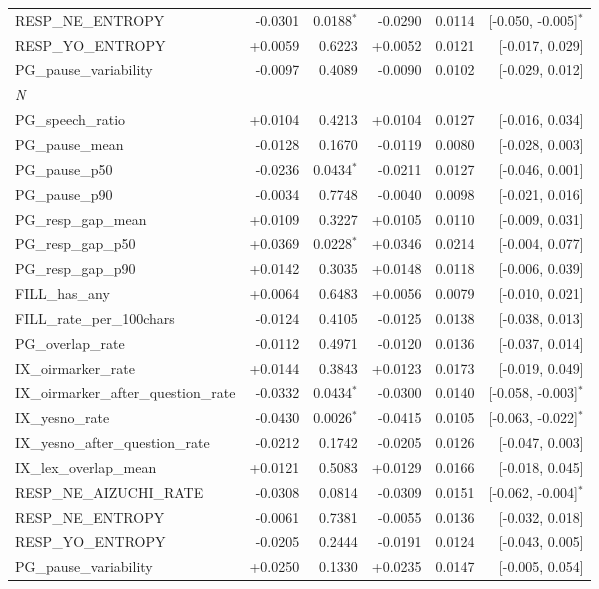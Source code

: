 \begin{longtable}{lrrrrr}
\quad RESP\_NE\_ENTROPY & -0.0301 & 0.0188$^{*}$ & -0.0290 & 0.0114 & [-0.050, -0.005]$^{*}$ \\
\quad RESP\_YO\_ENTROPY & +0.0059 & 0.6223 & +0.0052 & 0.0121 & [-0.017, 0.029] \\
\quad PG\_pause\_variability & -0.0097 & 0.4089 & -0.0090 & 0.0102 & [-0.029, 0.012] \\
\midrule
\multicolumn{6}{l}{\textit{N}} \\
\quad PG\_speech\_ratio & +0.0104 & 0.4213 & +0.0104 & 0.0127 & [-0.016, 0.034] \\
\quad PG\_pause\_mean & -0.0128 & 0.1670 & -0.0119 & 0.0080 & [-0.028, 0.003] \\
\quad PG\_pause\_p50 & -0.0236 & 0.0434$^{*}$ & -0.0211 & 0.0127 & [-0.046, 0.001] \\
\quad PG\_pause\_p90 & -0.0034 & 0.7748 & -0.0040 & 0.0098 & [-0.021, 0.016] \\
\quad PG\_resp\_gap\_mean & +0.0109 & 0.3227 & +0.0105 & 0.0110 & [-0.009, 0.031] \\
\quad PG\_resp\_gap\_p50 & +0.0369 & 0.0228$^{*}$ & +0.0346 & 0.0214 & [-0.004, 0.077] \\
\quad PG\_resp\_gap\_p90 & +0.0142 & 0.3035 & +0.0148 & 0.0118 & [-0.006, 0.039] \\
\quad FILL\_has\_any & +0.0064 & 0.6483 & +0.0056 & 0.0079 & [-0.010, 0.021] \\
\quad FILL\_rate\_per\_100chars & -0.0124 & 0.4105 & -0.0125 & 0.0138 & [-0.038, 0.013] \\
\quad PG\_overlap\_rate & -0.0112 & 0.4971 & -0.0120 & 0.0136 & [-0.037, 0.014] \\
\quad IX\_oirmarker\_rate & +0.0144 & 0.3843 & +0.0123 & 0.0173 & [-0.019, 0.049] \\
\quad IX\_oirmarker\_after\_question\_rate & -0.0332 & 0.0434$^{*}$ & -0.0300 & 0.0140 & [-0.058, -0.003]$^{*}$ \\
\quad IX\_yesno\_rate & -0.0430 & 0.0026$^{*}$ & -0.0415 & 0.0105 & [-0.063, -0.022]$^{*}$ \\
\quad IX\_yesno\_after\_question\_rate & -0.0212 & 0.1742 & -0.0205 & 0.0126 & [-0.047, 0.003] \\
\quad IX\_lex\_overlap\_mean & +0.0121 & 0.5083 & +0.0129 & 0.0166 & [-0.018, 0.045] \\
\quad RESP\_NE\_AIZUCHI\_RATE & -0.0308 & 0.0814 & -0.0309 & 0.0151 & [-0.062, -0.004]$^{*}$ \\
\quad RESP\_NE\_ENTROPY & -0.0061 & 0.7381 & -0.0055 & 0.0136 & [-0.032, 0.018] \\
\quad RESP\_YO\_ENTROPY & -0.0205 & 0.2444 & -0.0191 & 0.0124 & [-0.043, 0.005] \\
\quad PG\_pause\_variability & +0.0250 & 0.1330 & +0.0235 & 0.0147 & [-0.005, 0.054] \\
\end{longtable}
\endgroup
